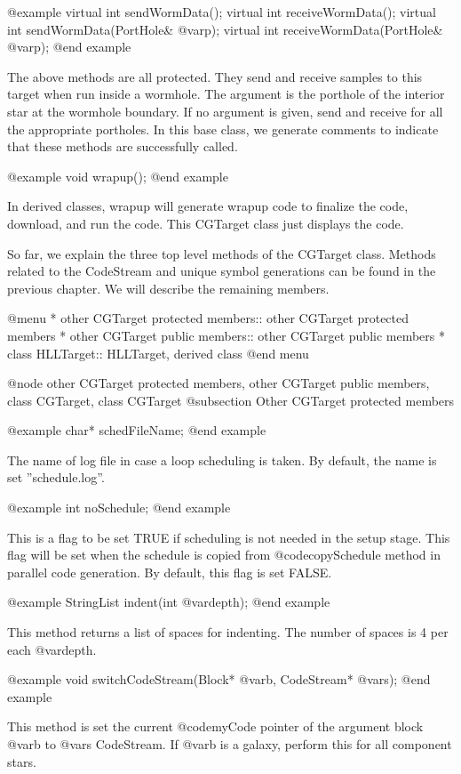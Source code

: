 @example
virtual int sendWormData();
virtual int receiveWormData();
virtual int sendWormData(PortHole& @var{p});
virtual int receiveWormData(PortHole& @var{p});
@end example

The above methods are all protected. They send and receive samples to this
target when run inside a wormhole. The argument is the porthole of the
interior star at the wormhole boundary. If no argument is given, send and
receive for all the appropriate portholes. In this base class, we generate
comments to indicate that these methods are successfully called.

@example
void wrapup();
@end example

In derived classes, wrapup will generate wrapup code to finalize the code,
download, and run the code. This CGTarget class just displays the code.

So far, we explain the three top level methods of the CGTarget class.
Methods related to the CodeStream and unique symbol generations can
be found in the previous chapter. We will describe the remaining members.

@menu
* other CGTarget protected members::	other CGTarget protected members
* other CGTarget public members::	other CGTarget public members
* class HLLTarget::			HLLTarget, derived class
@end menu

@node other CGTarget protected members, other CGTarget public members, class CGTarget, class CGTarget
@subsection Other CGTarget protected members

@example
char* schedFileName;
@end example

The name of log file in case a loop scheduling is taken. By default, the name
is set ''schedule.log''.

@example
int noSchedule;
@end example

This is a flag to be set TRUE if scheduling is not needed in the setup stage.
This flag will be set when the schedule is copied from @code{copySchedule}
method in parallel code generation. By default, this flag is set FALSE.

@example
StringList indent(int @var{depth});
@end example

This method returns a list of spaces for indenting. The number of spaces
is 4 per each @var{depth}.

@example
void switchCodeStream(Block* @var{b}, CodeStream* @var{s});
@end example

This method is set the current @code{myCode} pointer of the argument block
@var{b} to @var{s} CodeStream. If @var{b} is a galaxy, perform this for
all component stars.

